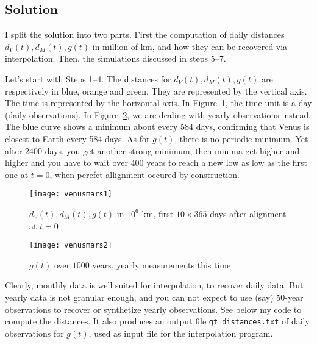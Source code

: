 \documentclass[oneside,10pt]{book}
\begin{document}

\subsection{Solution}

I split the solution into two parts. First the computation of daily distances $d_V(t), d_M(t), g(t)$ in million of km, and how they can be recovered via interpolation. Then, the simulations discussed in steps 5--7. 
 

Let's start with Steps 1--4. 
The distances for $d_V(t), d_M(t), g(t)$ are respectively in blue, orange and green. They are represented by the vertical axis. The time is represented
 by the horizontal axis. In Figure~\ref{fig:venus}, the time unit is a day (daily observations). In Figure~\ref{fig:venus2}, we are dealing with yearly observations
 instead. The blue curve shows a minimum about every 584 days, confirming that Venus is closest to Earth every 584 days. As for $g(t)$, there is no periodic minimum. Yet after 2400 days, you get another strong minimum, then minima get higher and higher and you have to wait over 400 years to reach a new low 
as low as the first one at $t=0$, when perefct allignment occured by construction. 

\begin{figure}[H]
\centering
\texttt{[image: venusmars1]} %
\caption{$d_V(t), d_M(t), g(t)$  in $10^6$ km, first $10\times 365$ days after alignment at $t=0$}
\label{fig:venus}
\end{figure}

\begin{figure}[H]
\centering
\texttt{[image: venusmars2]} %
\caption{$g(t)$ over $1000$ years, yearly  measurements this time}
\label{fig:venus2}
\end{figure}

Clearly, monthly data is well suited for interpolation, to recover daily data. But yearly data is not granular enough, and you can not expect to use (say) 50-year observations to recover or synthetize yearly observations. 
See below my code to compute the distances. It also produces an output file \texttt{gt\_distances.txt} of daily observations for $g(t)$, 
 used as input file for the interpolation program.\vspace{1ex}
\end{document}
